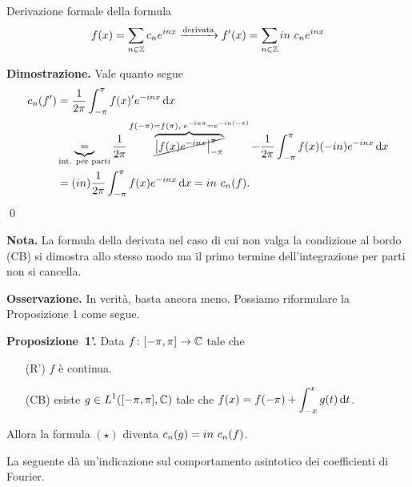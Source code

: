 Derivazione formale della formula
%
$$
	f(x) = \sum_{n \in \mathbb Z} c_n e^{inx} \xrightarrow{\text{derivata}} f'(x) = \sum_{n \in \mathbb Z} in \ c_n e^{inx} 
$$
%

\textbf{Dimostrazione.} Vale quanto segue
\begin{align*}
	c_n(f') & = \frac{1}{2\pi} \int_{-\pi}^\pi f(x)' e^{-inx} \,\mathrm{d} x \\
	& \underbrace{=}_{\text{int. per parti}} \frac{1}{2\pi} \overbrace{\cancel{\left| f(x) e^{-inx} \right|_{-\pi}^\pi}}^{f(-\pi) = f(\pi), \; e^{-in\pi} = e^{-in (-\pi)}} - \frac{1}{2\pi} \int_{-\pi}^\pi f(x) (-in) e^{-inx} \,\mathrm{d} x \\
	& = (in) \frac{1}{2\pi} \int_{-\pi}^\pi f(x) e^{-inx} \,\mathrm{d} x = in \ c_n(f).
\end{align*} 
\qed

\textbf{Nota.} La formula della derivata nel caso di cui non valga la condizione al bordo (CB) si dimostra allo stesso modo ma il primo termine dell'integrazione per parti non si cancella. 

\textbf{Osservazione.} In verità, basta ancora meno. Possiamo riformulare la Proposizione 1 come segue.

\textbf{Proposizione~1'.} Data $f \colon [-\pi,\pi] \to \mathbb C$ tale che
\begin{itemize}
	\item[(R')] $f$ è continua.

	\item[(CB)] esiste $\displaystyle g \in L^1([-\pi,\pi], \mathbb C)$ tale che $\displaystyle f(x) = f(-\pi) + \int_{-x}^x g(t) \,\mathrm{d} t $.

\end{itemize}
Allora la formula $(\star)$ diventa $\displaystyle c_n(g) = in \ c_n(f)$.

\vs

La seguente dà un'indicazione sul comportamento asintotico dei coefficienti di Fourier.


